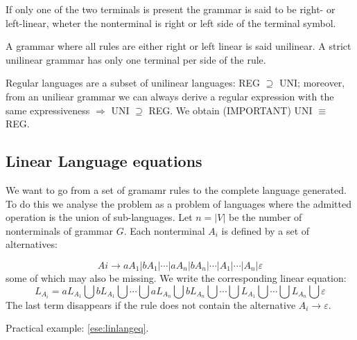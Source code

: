 			If only one of the two terminals is present the grammar is said to be right- or left-linear, wheter the nonterminal is right or left side of the 
			terminal symbol.

			A grammar where all rules are either right or left linear is said unilinear. A strict unilinear grammar has only one terminal per side of the rule.
			\begin{property}
				Regular languages are a subset of unilinear languages: REG $\supseteq$ UNI; moreover, from an uniliear grammar we can always derive a regular 
				expression with the same expressiveness $\Rightarrow$ UNI $\supseteq$ REG. We obtain (IMPORTANT) UNI $\equiv$ REG.
			\end{property}
		\subsection{Linear Language equations}\label{sect:linlangeq}
			We want to go from a set of gramamr rules to the complete language generated. To do this we analyse the problem as a problem of languages where the 
			admitted operation is the union of sub-languages.
			Let $n = \lvert V \rvert$ be the number of nonterminals of grammar $G$. Each nonterminal $A_i$ is defined by a set of alternatives:

			$$Ai \longrightarrow a A_1 \vert b A_1 \vert \cdots \vert a A_n \vert b A_n \vert \cdots \vert A_1 \vert \cdots \vert A_n \vert \varepsilon$$
			some of which may also be missing. We write the corresponding linear equation:
			$$L_{A_i} = a L_{A_1} \bigcup b L_{A_1} \bigcup \cdots \bigcup a L_{A_n} \bigcup b L_{A_n} \bigcup \cdots\bigcup L_{A_1} \bigcup \cdots \bigcup 
			L_{A_n} \bigcup \varepsilon$$
			The last term disappears if the rule does not contain the alternative $A_i \rightarrow\varepsilon$.
			
			Practical example: \ref{ese:linlangeq}.